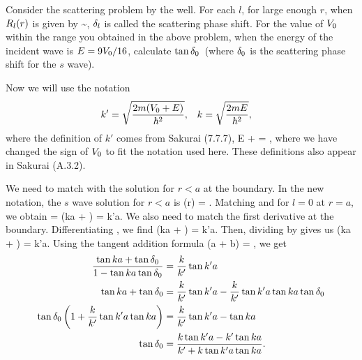 


\begin{problem}
	Consider the scattering problem by the well.  For each $l$, for large enough $r$, when $R_l(r)$ is given by
	\beqn \label{outside}
		\Rlr \sim \Al {},
	\eeqn
	$\delta_l$ is called the scattering phase shift.  For the value of $V_0$ within the range you obtained in the above problem, when the energy of the incident wave is $E = 9 V_0 / 16$, calculate $\tan\delta_0$~(where $\delta_0$ is the scattering phase shift for the $s$ wave).
\end{problem}

\begin{solution}
	Now we will use the notation
	\begin{align} \label{kk}
		k' &= \sqrt{\frac{2m (V_0 + E)}{\hbar^2}}, &
		k &= \sqrt{\frac{2m E}{\hbar^2}},
	\end{align}
	where the definition of $k'$ comes from Sakurai (7.7.7),
	\beq
		E + \Vo = ,
	\eeq
	where we have changed the sign of $V_0$ to fit the notation used here.  These definitions also appear in Sakurai (A.3.2).
	
	We need to match  with the solution for $r < a$ at the boundary.  In the new notation, the $s$ wave solution for $r < a$ is
	\beqn \label{inside}
		\Ro(r) = \Bo {}.
	\eeqn
	Matching  and  for $l = 0$ at $r = a$, we obtain
	\beqn \label{cont}
		\Ao {} = \Bo {}
		\qimplies
		\sin(ka + \delo) =  \sin k'a.
	\eeqn
	We also need to match the first derivative at the boundary.  Differentiating , we find
	\beqn \label{dcont}
		\cos(ka + \delo) =  \cos k'a.
	\eeqn
	Then, dividing  by  gives us
	\beq
		\tan(ka + \delo) =  \tan k'a.
	\eeq
	Using the tangent addition formula
	\beq
		\tan(a + b) = ,
	\eeq
	we get
	\begin{align}
		\frac{\tan ka + \tan \delta_0}{1 - \tan ka \tan \delta_0} &= \frac{k}{k'} \tan k'a \notag \\
		\tan ka + \tan \delta_0 &= \frac{k}{k'} \tan k'a - \frac{k}{k'} \tan k'a \tan ka \tan \delta_0 \notag \\
		\tan \delta_0 \left( 1 + \frac{k}{k'} \tan k'a \tan ka \right) &= \frac{k}{k'} \tan k'a - \tan ka \notag \\
		\tan \delta_0 &= \frac{k \tan k' a - k' \tan ka}{k' + k \tan k' a \tan ka}. \label{delo}
	\end{align}
	

\end{solution}

